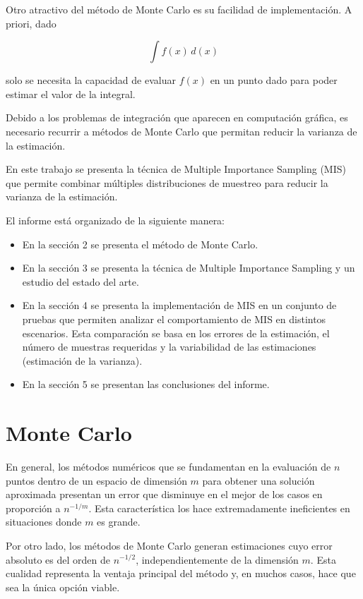 \documentclass{article}
\begin{document}
Otro atractivo del método de Monte Carlo es su facilidad de implementación. A priori, dado

$$ \int f(x) \,d(x)$$

solo se necesita la capacidad de evaluar $f(x)$ en un punto dado para poder estimar el valor de la integral.

Debido a los problemas de integración que aparecen en computación gráfica, es necesario recurrir a métodos de Monte Carlo que permitan reducir la varianza de la estimación.

En este trabajo se presenta la técnica de Multiple Importance Sampling (MIS) que permite combinar múltiples distribuciones de muestreo para reducir la varianza de la estimación.

El informe está organizado de la siguiente manera:
\begin{itemize}
\item En la sección 2 se presenta el método de Monte Carlo.
\item En la sección 3 se presenta la técnica de Multiple Importance Sampling y un estudio del estado del arte.
\item En la sección 4 se presenta la implementación de MIS en un conjunto de pruebas que permiten analizar el comportamiento de MIS en distintos escenarios.
Esta comparación se basa en los errores de la estimación, el número de muestras requeridas y la variabilidad de las estimaciones (estimación de la varianza).
\item En la sección 5 se presentan las conclusiones del informe.
\end{itemize}

\section{Monte Carlo}

En general, los métodos numéricos que se fundamentan en la evaluación de \( n \) puntos dentro de un espacio de dimensión \( m \) para obtener una solución aproximada presentan un error que disminuye en el mejor de los casos en proporción a \( n^{-1/m} \).
Esta característica los hace extremadamente ineficientes en situaciones donde \( m \) es grande.

Por otro lado, los métodos de Monte Carlo generan estimaciones cuyo error absoluto es del orden de \( n^{-1/2} \), independientemente de la dimensión \( m \). Esta cualidad representa la ventaja principal del método y, en muchos casos, hace que sea la única opción viable.
\end{document}
